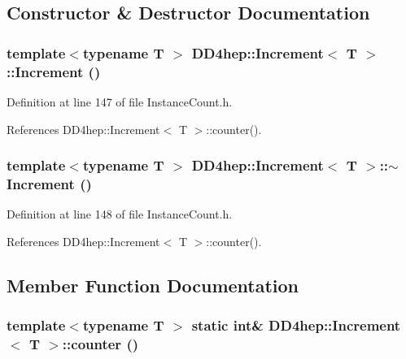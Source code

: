 \subsection{Constructor \& Destructor Documentation}
\hypertarget{struct_d_d4hep_1_1_increment_a50a4d78633dc0e8b3eca298c9e09bbb8}{
\subsubsection[{Increment}]{\setlength{\rightskip}{0pt plus 5cm}template$<$typename T $>$ {\bf DD4hep::Increment}$<$ {\bf T} $>$::{\bf Increment} ()}}
\label{struct_d_d4hep_1_1_increment_a50a4d78633dc0e8b3eca298c9e09bbb8}


Definition at line 147 of file InstanceCount.h.

References DD4hep::Increment$<$ T $>$::counter().\hypertarget{struct_d_d4hep_1_1_increment_ad2148abb952e3dbd20b46c081851affc}{
\subsubsection[{$\sim$Increment}]{\setlength{\rightskip}{0pt plus 5cm}template$<$typename T $>$ {\bf DD4hep::Increment}$<$ {\bf T} $>$::$\sim${\bf Increment} ()}}
\label{struct_d_d4hep_1_1_increment_ad2148abb952e3dbd20b46c081851affc}


Definition at line 148 of file InstanceCount.h.

References DD4hep::Increment$<$ T $>$::counter().

\subsection{Member Function Documentation}
\hypertarget{struct_d_d4hep_1_1_increment_afac4a87bcf31df0fb0053a61ec800048}{
\subsubsection[{counter}]{\setlength{\rightskip}{0pt plus 5cm}template$<$typename T $>$ static int\& {\bf DD4hep::Increment}$<$ {\bf T} $>$::counter ()}}
\label{struct_d_d4hep_1_1_increment_afac4a87bcf31df0fb0053a61ec800048}


